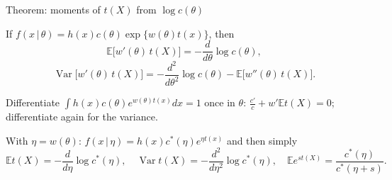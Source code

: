 \documentclass[aspectratio=169,t,10pt]{beamer}
\newcommand{\E}{\mathbb{E}}
\newcommand{\Var}{\operatorname{Var}}
\newcommand{\given}{\,|\,}
\begin{document}
\begin{frame}{Theorem: moments of $t(X)$ from $\log c(\theta)$}
  \begin{tcolorbox}[mythm={Theorem (CB 3.4.2, one-parameter, $k=1$)}]\footnotesize
  If $f(x\given\theta)=h(x)c(\theta)\exp\{w(\theta)t(x)\}$, then
  \[\E\bigl[w'(\theta)\,t(X)\bigr]=-\frac{d}{d\theta}\log c(\theta),\]
  \[\Var\bigl[w'(\theta)\,t(X)\bigr]=-\frac{d^2}{d\theta^2}\log c(\theta)-\E\bigl[w''(\theta)\,t(X)\bigr].\]
  \end{tcolorbox}
  \begin{tcolorbox}[mynote={Idea of the proof}]\footnotesize
  Differentiate $\int h(x)c(\theta)e^{w(\theta)t(x)}dx=1$ once in $\theta$: $\frac{c'}c+w'\E t(X)=0$; differentiate again for the variance.
  \end{tcolorbox}
  \begin{tcolorbox}[mydef={Natural parameterization}]\footnotesize
  With $\eta=w(\theta)$: $f(x\given\eta)=h(x)c^*(\eta)e^{\eta t(x)}$ and then simply
  \[\E t(X)=-\frac{d}{d\eta}\log c^*(\eta),\quad\Var t(X)=-\frac{d^2}{d\eta^2}\log c^*(\eta),\quad\E e^{st(X)}=\frac{c^*(\eta)}{c^*(\eta+s)}.\]
  \end{tcolorbox}
\end{frame}
\end{document}
